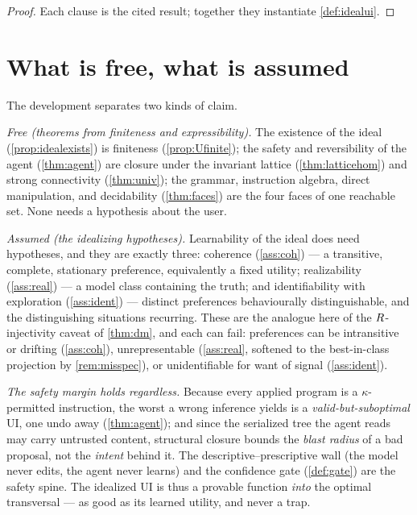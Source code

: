\documentclass[../uxoxo-main]{subfiles}
\begin{document}
\begin{proof}
Each clause is the cited result; together they instantiate \cref{def:idealui}.
\end{proof}

\section{What is free, what is assumed}\label{sec:limits}
The development separates two kinds of claim.

\emph{Free (theorems from finiteness and expressibility).} The existence of the
ideal (\cref{prop:idealexists}) is finiteness (\cref{prop:Ufinite}); the safety
and reversibility of the agent (\cref{thm:agent}) are closure under the invariant
lattice (\cref{thm:latticehom}) and strong connectivity (\cref{thm:univ}); the
grammar, instruction algebra, direct manipulation, and decidability
(\cref{thm:faces}) are the four faces of one reachable set. None needs a
hypothesis about the user.

\emph{Assumed (the idealizing hypotheses).} Learnability of the ideal does need
hypotheses, and they are exactly three: coherence (\cref{ass:coh}) --- a
transitive, complete, stationary preference, equivalently a fixed utility;
realizability (\cref{ass:real}) --- a model class containing the truth; and
identifiability with exploration (\cref{ass:ident}) --- distinct preferences
behaviourally distinguishable, and the distinguishing situations recurring. These
are the analogue here of the $R$-injectivity caveat of \cref{thm:dm}, and
each can fail: preferences can be intransitive or drifting (\cref{ass:coh}),
unrepresentable (\cref{ass:real}, softened to the best-in-class projection by
\cref{rem:misspec}), or unidentifiable for want of signal (\cref{ass:ident}).

\emph{The safety margin holds regardless.} Because every applied program is a
$\kappa$-permitted instruction, the worst a wrong inference yields is a
\emph{valid-but-suboptimal} UI, one undo away (\cref{thm:agent}); and since the
serialized tree the agent reads may carry untrusted content, structural closure
bounds the \emph{blast radius} of a bad proposal, not the \emph{intent} behind
it. The descriptive--prescriptive wall (the model never edits, the agent never
learns) and the confidence gate (\cref{def:gate}) are the safety spine. The
idealized UI is thus a provable function \emph{into} the optimal transversal ---
as good as its learned utility, and never a trap.
\end{document}
